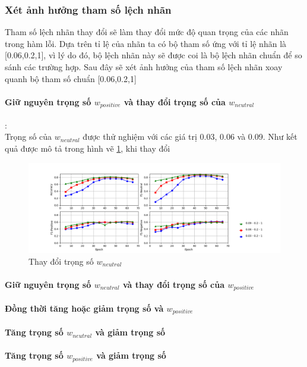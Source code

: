 \documentclass[fontsize=12pt]{scrartcl}
\begin{document}
\subsubsection{Xét ảnh hưởng tham số lệch nhãn}
Tham số lệch nhãn thay đổi sẽ làm thay đổi mức độ quan trọng của các nhãn trong hàm lỗi. Dựa trên tỉ lệ của nhãn ta có bộ tham số ứng với tỉ lệ nhãn là [0.06,0.2,1], vì lý do đó, bộ lệch nhãn này sẽ được coi là bộ lệch nhãn chuẩn để so sánh các trường hợp. Sau đây sẽ xét ảnh hưởng của tham số lệch nhãn xoay quanh bộ tham số chuẩn [0.06,0.2,1]
\paragraph*{Giữ nguyên trọng số $w_{positive}$ và thay đổi trọng số của $w_{neutral}$}:\\
Trọng số của $w_{neutral}$ được thử nghiệm với các giá trị 0.03, 0.06 và 0.09. Như kết quả được mô tả trong hình vẽ \ref{w_neutral}, khi thay đổi
\begin{figure}
     \includegraphics[width=\textwidth]{img/so_sanh_1}
      \caption{Thay đổi trọng số $w_{neutral}$}
       \label{w_neutral}
\end{figure}
\paragraph*{Giữ nguyên trọng số $w_{neutral}$ và thay đổi trọng số của $w_{positive}$}
\paragraph*{Đồng thời tăng hoặc giảm trọng số   và $w_{positive}$}
\paragraph*{Tăng trọng số $w_{neutral}$ và giảm trọng số }
\paragraph*{Tăng trọng số $w_{positive}$ và giảm trọng số }
\end{document}
